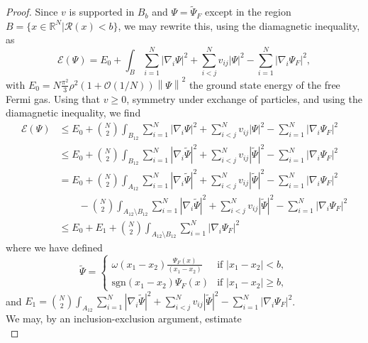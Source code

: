 \documentclass[a4paper,11pt]{article}
\newcommand{\norm}[1]{\left\lVert #1 \right\rVert}
\newcommand{\abs}[1]{\left\lvert #1 \right\rvert}
\newcommand{\R}{\mathbb{R}}
\newcommand{\rr}{\mathcal{R}}
\numberwithin{equation}{section}
\begin{document}
	\begin{proof}
		Since $ v $ is supported in $ B_b $ and $ \Psi=\tilde{\Psi}_F $ except in the region $ B=\{x\in\R^N \vert \rr(x)<b \} $, we may rewrite this, using the diamagnetic inequality, as \begin{equation}
		\mathcal{E}(\Psi)=E_0+\int_B \sum_{i=1}^{N}\abs{\nabla_i\Psi}^2+\sum_{i<j}^{N}v_{ij}\abs{\Psi}^2-\sum_{i=1}^{N}\abs{\nabla_i\Psi_F}^2,
		\end{equation}
		with $ E_0=N\frac{\pi^2}{3}\rho^2(1+\mathcal{O}(1/N))\norm{\Psi}^2 $ the ground state energy of the free Fermi gas. Using that $ v\geq0 $, symmetry under exchange of particles, and using the diamagnetic inequality, we find \begin{equation}
		\begin{aligned}
		\mathcal{E}(\Psi)&\leq E_0+\binom{N}{2}\int_{B_{12}} \sum_{i=1}^{N}\abs{\nabla_i\Psi}^2+\sum_{i<j}^{N}v_{ij}\abs{\Psi}^2-\sum_{i=1}^{N}\abs{\nabla_i\Psi_F}^2\\&
		\leq E_0+\binom{N}{2}\int_{B_{12}} \sum_{i=1}^{N}\abs{\nabla_i\tilde{\Psi}}^2+\sum_{i<j}^{N}v_{ij}\abs{\tilde{\Psi}}^2-\sum_{i=1}^{N}\abs{\nabla_i\Psi_F}^2\\&
		=E_0+\binom{N}{2}\int_{A_{12}} \sum_{i=1}^{N}\abs{\nabla_i\tilde{\Psi}}^2+\sum_{i<j}^{N}v_{ij}\abs{\tilde{\Psi}}^2-\sum_{i=1}^{N}\abs{\nabla_i\Psi_F}^2\\&\qquad
		-\binom{N}{2}\int_{A_{12}\setminus B_{12}} \sum_{i=1}^{N}\abs{\nabla_i\tilde{\Psi}}^2+\sum_{i<j}^{N}v_{ij}\abs{\tilde{\Psi}}^2-\sum_{i=1}^{N}\abs{\nabla_i\Psi_F}^2\\&
		\leq E_0+E_1+\binom{N}{2}\int_{A_{12}\setminus B_{12}}\sum_{i=1}^{N}\abs{\nabla_i\Psi_F}^2
		\end{aligned}
		\end{equation}
		where we have defined \begin{equation*}
		\tilde{\Psi}=\begin{cases}
		\omega(x_1-x_2)\frac{\Psi_F(x)}{(x_1-x_2)}& \text{if }\abs{x_1-x_2}<b,\\
		\text{sgn}(x_1-x_2)\Psi_F(x)&\text{if }\abs{x_1-x_2}\geq b,
		\end{cases}
		\end{equation*} and $ E_1=\binom{N}{2}\int_{A_{12}} \sum_{i=1}^{N}\abs{\nabla_i\tilde{\Psi}}^2+\sum_{i<j}^{N}v_{ij}\abs{\tilde{\Psi}}^2-\sum_{i=1}^{N}\abs{\nabla_i\Psi_F}^2 $.\\	
		We may, by an inclusion-exclusion argument, estimate\begin{equation}

\end{equation}
\end{proof}
\end{document}
